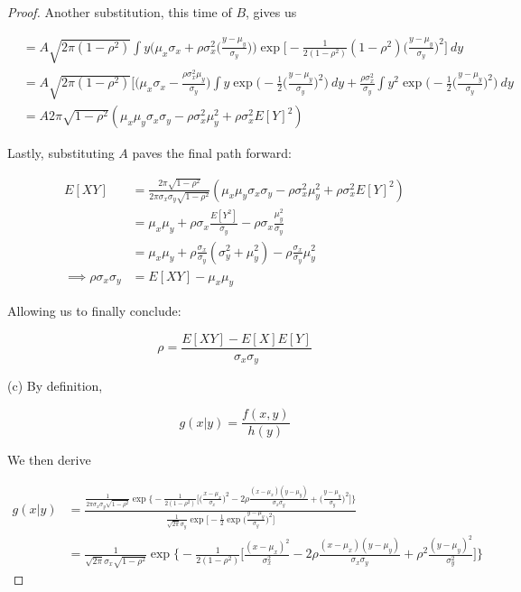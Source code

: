 \documentclass[10pt, oneside]{article}   	%
\theoremstyle{definition}
\begin{document}
\begin{enumerate}[label=9.\arabic*]
\begin{proof}
Another substitution, this time of $B$, gives us

\begin{align*}
&= A \sqrt{2 \pi (1-\rho^2)} \int y \bigg( \mu_x \sigma_x + \rho \sigma^2_x \bigg( \frac{y - \mu_y}{\sigma_y} \bigg) \bigg) \exp \bigg[ -\frac{1}{2(1-\rho^2)} (1-\rho^2) \bigg( \frac{y-\mu_y}{\sigma_y} \bigg)^2 \bigg] \ dy \\
&= A \sqrt{2 \pi (1-\rho^2)} \bigg[ \bigg( \mu_x \sigma_x - \frac{\rho \sigma^2_x \mu_y}{\sigma_y} \bigg) \int y \exp \bigg( -\frac{1}{2} \bigg( \frac{y - \mu_y}{\sigma_y} \bigg)^2 \bigg) \ dy + \frac{\rho \sigma^2_x}{\sigma_y} \int y^2 \exp \bigg( -\frac{1}{2} \bigg( \frac{y - \mu_y}{\sigma_y} \bigg)^2 \bigg) \ dy \\
&= A 2 \pi \sqrt{1-\rho^2} (\mu_x \mu_y \sigma_x \sigma_y  - \rho \sigma^2_x \mu^2_y + \rho \sigma^2_x E[Y]^2 )
\end{align*}

Lastly, substituting $A$ paves the final path forward:

\begin{align*}
E[XY] &= \frac{2\pi \sqrt{1-\rho^2}}{2\pi \sigma_x \sigma_y \sqrt{1-\rho^2}} (\mu_x \mu_y \sigma_x \sigma_y  - \rho \sigma^2_x \mu^2_y + \rho \sigma^2_x E[Y]^2 ) \\
&= \mu_x \mu_y + \rho \sigma_x \frac{E[Y^2]}{\sigma_y} - \rho \sigma_x \frac{\mu^2_y}{\sigma_y} \\
&= \mu_x \mu_y + \rho \frac{\sigma_x}{\sigma_y} (\sigma^2_y + \mu^2_y) - \rho \frac{\sigma_x}{\sigma_y} \mu^2_y \\
\implies \rho \sigma_x \sigma_y &= E[XY] - \mu_x \mu_y
\end{align*}

Allowing us to finally conclude:

\[ \boxed{\rho = \frac{E[XY] - E[X] E[Y]}{\sigma_x \sigma_y} } \]

(c) By definition, 

\[ g(x | y) = \frac{f(x,y)}{h(y)} \]

We then derive

\begin{align*}
g(x | y) &= \frac{\frac{1}{2\pi \sigma_x \sigma_y \sqrt{1-\rho^2}} \exp \big\{ -\frac{1}{2(1-\rho^2)} \big[ \big( \frac{x-\mu_x}{\sigma_x} \big)^2 - 2\rho \frac{(x-\mu_x)(y-\mu_y)}{\sigma_x \sigma_y} + \big( \frac{y-\mu_y}{\sigma_y} \big)^2 \big] \big\} }{ \frac{1}{\sqrt{2\pi} \sigma_y} \exp \big[ -\frac{1}{2} \exp \big( \frac{y-\mu_y}{\sigma_y} \big)^2 \big] } \\
&= \frac{1}{\sqrt{2\pi} \sigma_x \sqrt{1-\rho^2}} \exp \bigg\{ -\frac{1}{2(1-\rho^2)} \bigg[ \frac{(x-\mu_x)^2}{\sigma^2_x}  - 2\rho \frac{(x-\mu_x)(y-\mu_y)}{\sigma_x \sigma_y} + \rho^2 \frac{(y - \mu_y)^2}{\sigma^2_y} \bigg] \bigg\}
\end{align*}


\end{proof}
\end{enumerate}
\end{document}
